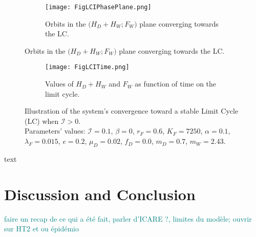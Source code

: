\documentclass{article}
\newcommand{\lfw}{\lambda_{F}}
\newcommand{\lfw}{\lambda_{F}}
\newcommand{\cI}{\mathcal{I}}
\newcommand{\marc}[1]{\textcolor{teal}{#1}}
\theoremstyle{definition}
\theoremstyle{remark}
\begin{document}
\begin{figure}[!ht]
\begin{subfigure}{1\textwidth}
\centering
\texttt{[image: FigLCIPhasePlane.png]}
\caption{\centering Orbits in the $\Big(H_D + H_W ; F_W\Big)$ plane converging towards the LC.}
\label{fig:LCI, 1}
\end{subfigure}
\end{figure}
\begin{figure}
\ContinuedFloat
\begin{subfigure}{1\textwidth}
\centering
\texttt{[image: FigLCITime.png]}
\caption{\centering Values of $H_D + H_W$ and $F_W$ as function of time on the limit cycle.}
\label{fig:LCI, 2}
\end{subfigure}
\caption{ Illustration of the system's convergence toward a stable Limit Cycle (LC) when $\cI > 0$. \\
Parameters' values: $\cI = 0.1$, $\beta = 0$, $r_F = 0.6$, $K_F = 7250$, $\alpha = 0.1$, $\lfw = 0.015$, $e = 0.2$, $\mu_D = 0.02$, $f_D = 0.0$, $m_D = 0.7$, $m_W = 2.43$.}
\label{fig:LCI}
\end{figure}


\newpage
text
\newpage
\section{Discussion and Conclusion} \label{sec:conclusion}

\marc{faire un recap de ce qui a été fait, parler d'ICARE ?, limites du modèle; ouvrir sur HT2 et ou épidémio}
\end{document}
